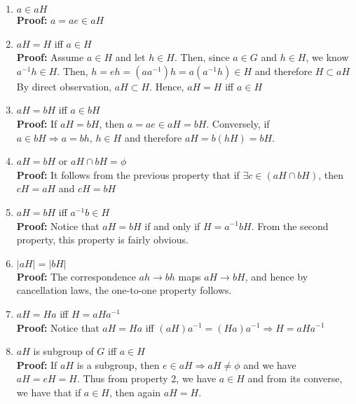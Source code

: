 \documentclass[a4paper, 12pt]{article}
\numberwithin{equation}{section}
\begin{document}
\begin{enumerate}
\item $a \in aH$\\
	\textbf{Proof:} $a = ae \in aH$
\item $aH = H$ iff $a \in H$\\
	\textbf{Proof:} Assume $a \in H$ and let $h \in H$. Then, since $a \in G$ and $h \in H$, we know $a^{-1}h \in H$. Then, $h = eh = (aa^{-1})h = a(a^{-1}h) \in H$ and therefore $H \subset aH$ By direct observation, $aH \subset H$. Hence, $aH = H$ iff $a \in H$
	
\item $aH = bH$ iff $a \in bH$\\
	\textbf{Proof:} If $aH = bH$, then $a = ae \in aH = bH$. Conversely, if $a \in bH \Rightarrow a = bh, \,h \in H$ and therefore $aH = b(hH) = bH$.
	
\item $aH = bH$ or $aH \cap bH = \phi$\\
	\textbf{Proof:} It follows from the previous property that if $\exists c \in (aH \cap bH)$, then $cH = aH$ and $cH = bH$
	
\item $aH = bH$ iff $a^{-1}b \in H$\\
	\textbf{Proof:} Notice that $aH = bH$ if and only if $H = a^{-1}bH$. From the second property, this property is fairly obvious.
	
\item $|aH| = |bH|$\\
	\textbf{Proof:} The correspondence $ah \to bh$ maps $aH \to bH$, and hence by cancellation laws, the one-to-one property follows.
	
\item $aH = Ha$ iff $H = aHa^{-1}$\\
	\textbf{Proof:} Notice that $aH = Ha$ iff $(aH)a^{-1} = (Ha)a^{-1} \Rightarrow H = aHa^{-1}$
	
\item $aH$ is subgroup of $G$ iff $a \in H$\\
	\textbf{Proof:} If $aH$ is a subgroup, then $e \in aH \Rightarrow aH \neq \phi$ and we have $aH = eH = H$. Thus from property 2, we have $a \in H$ and from its converse, we have that if $a \in H$, then again $aH = H$.
	
\end{enumerate}
\end{document}
